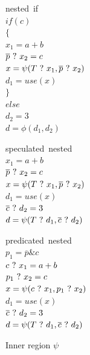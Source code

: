 \begin{figure}
\footnotesize
\begin{minipage}[t]{3.5cm}
\mbox{nested if} \\
$ if (c) $ \\
$ \{ $ \\
\hspace*{2mm}$ x_1 = a + b $ \\
\hspace*{2mm}$ \overline{p} ~?~ x_2 = c $ \\
\hspace*{2mm}$ x = \psi(T ~?~ x_1, \overline{p} ~?~ x_2) $ \\
\hspace*{2mm}$ d_1 = use (x) $ \\
$ \} $ \\
$ else $ \\
\hspace*{2mm}$ d_2 = 3 $ \\
$ d = \phi(d_1,d_2) $ \\
\label{nested_psi}
\end{minipage}
\begin{minipage}[t]{3.5cm}
\mbox{speculated nested} \\
$ x_1 = a + b $ \\
$ \overline{p} ~?~ x_2 = c $ \\
$ x = \psi(T ~?~ x_1, \overline{p} ~?~ x_2) $ \\
$ d_1 = use (x) $ \\
$ \overline{c} ~?~ d_2 = 3 $ \\
$ d = \psi(T ~?~ d_1, \overline{c} ~?~ d_2) $ \\
\label{nested_psi_speculated}
\end{minipage}
\begin{minipage}[t]{3.5cm}
\mbox{predicated nested} \\
$ p_1 = \overline{p} \& {c} $ \\
$ c ~?~ x_1 = a + b $ \\
$ p_1 ~?~ x_2 = c $ \\
$ x = \psi(c ~?~ x_1, p_1 ~?~ x_2) $ \\
$ d_1 = use (x) $ \\
$ \overline{c} ~?~ d_2 = 3 $ \\
$ d = \psi(T ~?~ d_1, \overline{c} ~?~ d_2) $ \\
\label{nested_psi_predicated}
\end{minipage}
\caption{Inner region $\psi$}
\end{figure}

